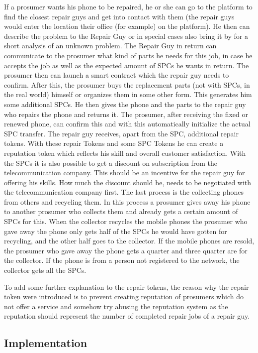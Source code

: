 \documentclass[11pt]{scrartcl}
\begin{document}
If a prosumer wants his phone to be repaired, he or she can go to the platform to find the closest repair guys and get into contact with them (the repair guys would enter the location their office (for example) on the platform). He then can describe the problem to the Repair Guy or in special cases also bring it by for a short analysis of an unknown problem. The Repair Guy in return can communicate to the prosumer what kind of parts he needs for this job, in case he accepts the job as well as the expected amount of SPCs he wants in return. The prosumer then can launch a smart contract which the repair guy needs to confirm. After this, the prosumer buys the replacement parts (not with SPCs, in the real world) himself or organizes them in some other form. This generates him some additional SPCs. He then gives the phone and the parts to the repair guy who repairs the phone and returns it. The prosumer, after receiving the fixed or renewed phone, can confirm this and with this automatically initialize the actual SPC transfer. The repair guy receives, apart from the SPC, additional repair tokens. With these repair Tokens and some SPC Tokens he can create a reputation token which reflects his skill and overall customer satisfaction. With the SPCs it is also possible to get a discount on subscription from the telecommunication company. This should be an incentive for the repair guy for offering his skills. How much the discount should be, needs to be negotiated with the telecommunication company first. The last process is the collecting phones from others and recycling them. In this process a prosumer gives away his phone to another prosumer who collects them and already gets a certain amount of SPCs for this. When the collector recycles the mobile phones the prosumer who gave away the phone only gets half of the SPCs he would have gotten for recycling, and the other half goes to the collector. If the mobile phones are resold, the prosumer who gave away the phone gets a quarter and three quarter are for the collector. If the phone is from a person not registered to the network, the collector gets all the SPCs.

To add some further explanation to the repair tokens, the reason why the repair token were introduced is to prevent creating reputation of prosumers which do not offer a service and somehow try abusing the reputation system as the reputation should represent the number of completed repair jobs of a repair guy.

\subsection{Implementation}
\end{document}
